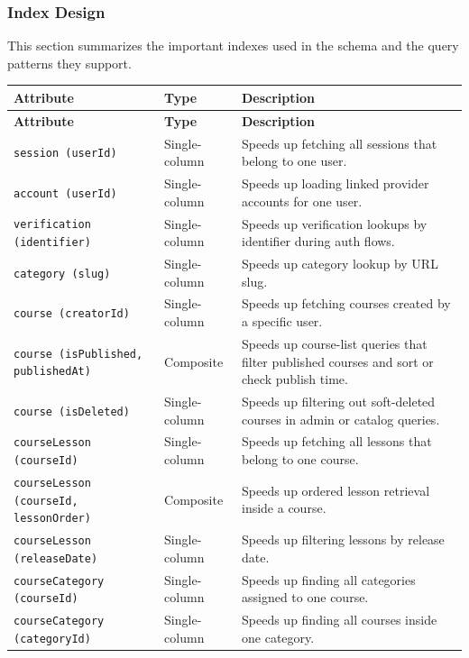 \endgroup

\subsubsection{Index Design}

\noindent
This section summarizes the important indexes used in the schema and the query patterns they support.

\begingroup
\small
\renewcommand{\arraystretch}{1.15}
\begin{longtable}{L{4.3cm}L{2.6cm}L{6.3cm}}
\toprule
\textbf{Attribute} & \textbf{Type} & \textbf{Description} \\
\midrule
\endfirsthead
\toprule
\textbf{Attribute} & \textbf{Type} & \textbf{Description} \\
\midrule
\endhead
\bottomrule
\endfoot
\texttt{session (userId)} & Single-column & Speeds up fetching all sessions that belong to one user. \\
\texttt{account (userId)} & Single-column & Speeds up loading linked provider accounts for one user. \\
\texttt{verification (identifier)} & Single-column & Speeds up verification lookups by identifier during auth flows. \\
\texttt{category (slug)} & Single-column & Speeds up category lookup by URL slug. \\
\texttt{course (creatorId)} & Single-column & Speeds up fetching courses created by a specific user. \\
\texttt{course (isPublished, publishedAt)} & Composite & Speeds up course-list queries that filter published courses and sort or check publish time. \\
\texttt{course (isDeleted)} & Single-column & Speeds up filtering out soft-deleted courses in admin or catalog queries. \\
\texttt{courseLesson (courseId)} & Single-column & Speeds up fetching all lessons that belong to one course. \\
\texttt{courseLesson (courseId, lessonOrder)} & Composite & Speeds up ordered lesson retrieval inside a course. \\
\texttt{courseLesson (releaseDate)} & Single-column & Speeds up filtering lessons by release date. \\
\texttt{courseCategory (courseId)} & Single-column & Speeds up finding all categories assigned to one course. \\
\texttt{courseCategory (categoryId)} & Single-column & Speeds up finding all courses inside one category. \\

\end{longtable}
